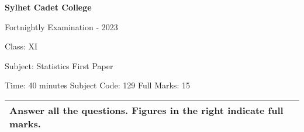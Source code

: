 \documentclass{article}
\begin{document}
\begin{center}
  \bfseries\large
  Sylhet Cadet College

\normalsize
Fortnightly Examination - 2023

  Class: XI

  Subject: Statistics First Paper

  Time: 40 minutes \qquad \qquad  \qquad \qquad Subject Code: 129  \qquad  \qquad \qquad  \qquad Full Marks: 15

\end{center}

\noindent
\begin{tabular}{p{\dimexpr\linewidth-2\tabcolsep}}
  \textbf{Answer all the questions. Figures in the right indicate full marks.}\\
  \hline
\end{tabular}
\end{document}
